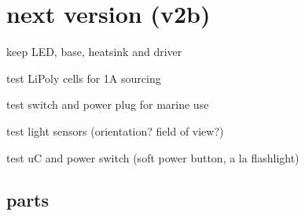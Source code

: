 \documentclass[12pt]{article} %
\begin{document}
\section{next version (v2b)}
\begin{compactitem}
	\item keep LED, base, heatsink and driver
	\item test LiPoly cells for 1A sourcing
	\item test switch and power plug for marine use
	\item test light sensors (orientation? field of view?)
	\item test uC and power switch (soft power button, a la flashlight)
\end{compactitem}

\subsection{parts}
\end{document}
